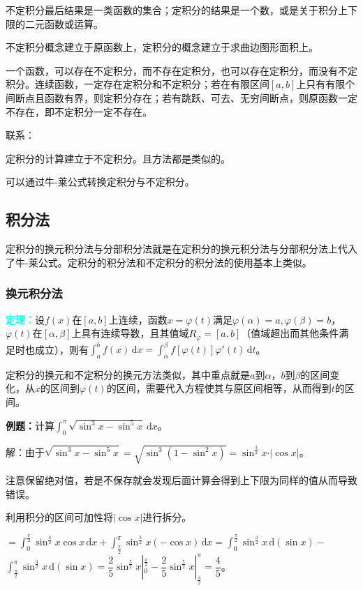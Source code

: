 \documentclass[UTF8, 12pt]{ctexart}
\begin{document}
        不定积分最后结果是一类函数的集合；定积分的结果是一个数，或是关于积分上下限的二元函数或运算。

        不定积分概念建立于原函数上，定积分的概念建立于求曲边图形面积上。

        一个函数，可以存在不定积分，而不存在定积分，也可以存在定积分，而没有不定积分。连续函数，一定存在定积分和不定积分；若在有限区间$[a,b]$上只有有限个间断点且函数有界，则定积分存在；若有跳跃、可去、无穷间断点，则原函数一定不存在，即不定积分一定不存在。

        联系：

        定积分的计算建立于不定积分。且方法都是类似的。

        可以通过牛-莱公式转换定积分与不定积分。

        \subsection{积分法}

        定积分的换元积分法与分部积分法就是在定积分的换元积分法与分部积分法上代入了牛-莱公式。定积分的积分法和不定积分的积分法的使用基本上类似。

        \subsubsection{换元积分法}

        \textcolor{aqua}{\textbf{定理：}}设$f(x)$在$[a,b]$上连续，函数$x=\varphi(t)$满足$\varphi(\alpha)=a,\varphi(\beta)=b$，$\varphi(t)$在$[\alpha,\beta]$上具有连续导数，且其值域$R_\varphi=[a,b]$（值域超出而其他条件满足时也成立），则有$\int_a^bf(x)\,\textrm{d}x=\int_\alpha^\beta f[\varphi(t)]\varphi'(t)\,\textrm{d}t$。

        定积分的换元和不定积分的换元方法类似，其中重点就是$a$到$\alpha$，$b$到$\beta$的区间变化，从$x$的区间到$\varphi(t)$的区间，需要代入方程使其与原区间相等，从而得到$t$的区间。

        \textbf{例题：}计算$\int_0^\pi\sqrt{\sin^3x-\sin^5x}\,\textrm{d}x$。

        解：由于$\sqrt{\sin^3x-\sin^5x}=\sqrt{\sin^3(1-\sin^2x)}=\sin^\frac{3}{2}x\cdot\vert\cos x\vert$。

        注意保留绝对值，若是不保存就会发现后面计算会得到上下限为同样的值从而导致错误。

        利用积分的区间可加性将$\vert\cos x\vert$进行拆分。

        $=\int_0^\frac{\pi}{2}\sin^\frac{3}{2}x\cos x\,\textrm{d}x+\int_\frac{\pi}{2}^\pi\sin^\frac{3}{2}x(-\cos x)\,\textrm{d}x=\int_0^\frac{\pi}{2}\sin^\frac{3}{2}x\,\textrm{d}(\sin x)-$\\$\int_\frac{\pi}{2}^\pi\sin^\frac{3}{2}x\,\textrm{d}(\sin x)=\dfrac{2}{5}\sin^\frac{5}{2}x|_0^\frac{\pi}{2}-\dfrac{2}{5}\sin^\frac{5}{2}x|_\frac{\pi}{2}^\pi=\dfrac{4}{5}$。
\end{document}
